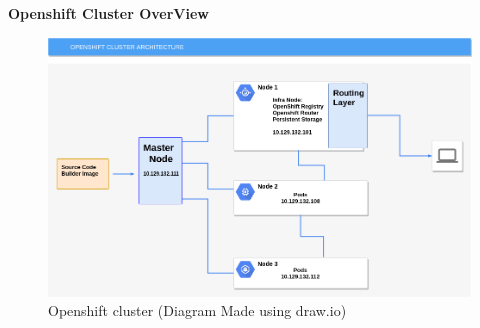 \documentclass[11pt]{report}
\begin{document}
	\pagebreak
	\textbf{Openshift Cluster OverView}
	\vspace{2cm}
	\begin{figure}[h!]
    	\begin{center}
    	   		\includegraphics[scale = 0.5]{OpenShiftArchitecture}
    		\caption{Openshift cluster (Diagram Made using draw.io)}
    	  \end{center}
	  
	\end{figure}
	\pagebreak
\end{document}
